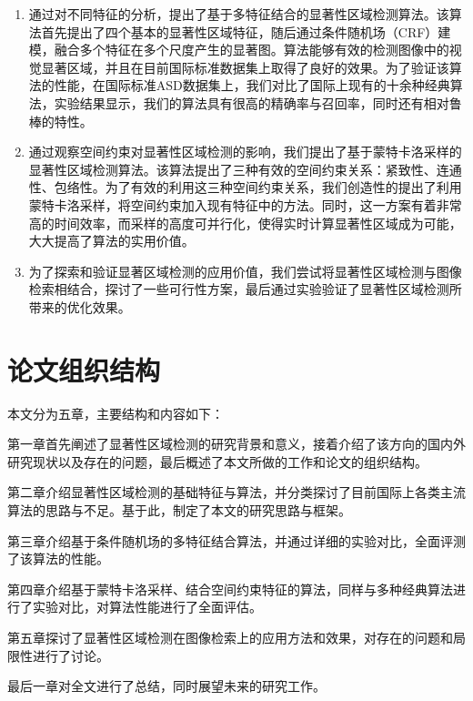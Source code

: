 \begin{enumerate}
\item 通过对不同特征的分析，提出了基于多特征结合的显著性区域检测算法。该算法首先提出了四个基本的显著性区域特征，随后通过条件随机场（CRF）建模，融合多个特征在多个尺度产生的显著图。算法能够有效的检测图像中的视觉显著区域，并且在目前国际标准数据集上取得了良好的效果。为了验证该算法的性能，在国际标准ASD数据集上，我们对比了国际上现有的十余种经典算法，实验结果显示，我们的算法具有很高的精确率与召回率，同时还有相对鲁棒的特性。
\item 通过观察空间约束对显著性区域检测的影响，我们提出了基于蒙特卡洛采样的显著性区域检测算法。该算法提出了三种有效的空间约束关系：紧致性、连通性、包络性。为了有效的利用这三种空间约束关系，我们创造性的提出了利用蒙特卡洛采样，将空间约束加入现有特征中的方法。同时，这一方案有着非常高的时间效率，而采样的高度可并行化，使得实时计算显著性区域成为可能，大大提高了算法的实用价值。
\item 为了探索和验证显著区域检测的应用价值，我们尝试将显著性区域检测与图像检索相结合，探讨了一些可行性方案，最后通过实验验证了显著性区域检测所带来的优化效果。
\end{enumerate}

\section{论文组织结构}
本文分为五章，主要结构和内容如下：

第一章首先阐述了显著性区域检测的研究背景和意义，接着介绍了该方向的国内外研究现状以及存在的问题，最后概述了本文所做的工作和论文的组织结构。

第二章介绍显著性区域检测的基础特征与算法，并分类探讨了目前国际上各类主流算法的思路与不足。基于此，制定了本文的研究思路与框架。

第三章介绍基于条件随机场的多特征结合算法，并通过详细的实验对比，全面评测了该算法的性能。

第四章介绍基于蒙特卡洛采样、结合空间约束特征的算法，同样与多种经典算法进行了实验对比，对算法性能进行了全面评估。

第五章探讨了显著性区域检测在图像检索上的应用方法和效果，对存在的问题和局限性进行了讨论。

最后一章对全文进行了总结，同时展望未来的研究工作。
